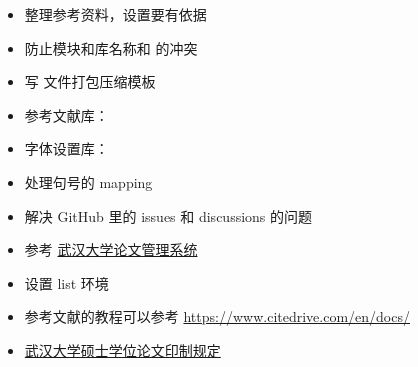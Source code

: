 \begin{itemize}[midpenalty=-1000,
  label=\protect\raisebox{-.3ex}{\NotDone}]
\begin{enumerate}
\begin{itemize}[midpenalty=-1000,
          label=\protect\raisebox{-.3ex}{\NotDone}]
          \item {}: 本科。参考最新的 2024 的本科模板。
          \item {}: 硕士
          \item {}: 博士
          \item {}: 数学与统计学院，兼容黄正华老师的模板配置。参考
            \begin{itemize}
              \item {}
              \item 黄正华老师的模板
            \end{itemize}
            子库：
            \begin{itemize}
              \item {}
              \item {}
              \item {}
            \end{itemize}
          \item {}: 计算机学院。参考 \href{https://github.com/cylqqqcyl/whu-thesis-2024}{cylqqqcyl 针对计算机学院改的模板}
          \item {}: 国家网络安全学院。参考网安用户上传的模板
        \end{itemize}
    \end{enumerate}
  \item 整理参考资料，设置要有依据
  \item[\Done] 防止模块和库名称和 \CusTeX 的冲突
  \item 写  文件打包压缩模板
  \item 参考文献库：
  \item 字体设置库：
  \item 处理句号的 mapping
  \item 解决  GitHub 里的 issues 和 discussions 的问题
  \item 参考 \href{http://paper.lib.whu.edu.cn/newlist.action?encid=44}{武汉大学论文管理系统} 
  \item 设置 list 环境
  \item 参考文献的教程可以参考 \url{https://www.citedrive.com/en/docs/}
  \item \href{https://gs.whu.edu.cn/info/1022/3235.htm}{武汉大学硕士学位论文印制规定}
\end{itemize}